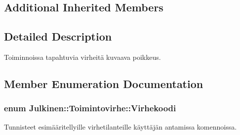 \subsection*{Additional Inherited Members}


\subsection{Detailed Description}
Toiminnoissa tapahtuvia virheitä kuvaava poikkeus. 

\subsection{Member Enumeration Documentation}
\hypertarget{class_julkinen_1_1_toimintovirhe_a5b3c981a2e64a397ac982787bf310a2c}{}
\subsubsection[{Virhekoodi}]{\setlength{\rightskip}{0pt plus 5cm}enum {\bf Julkinen\+::\+Toimintovirhe\+::\+Virhekoodi}}\label{class_julkinen_1_1_toimintovirhe_a5b3c981a2e64a397ac982787bf310a2c}


Tunnisteet esimääritellyille virhetilanteille käyttäjän antamissa komennoissa. 

